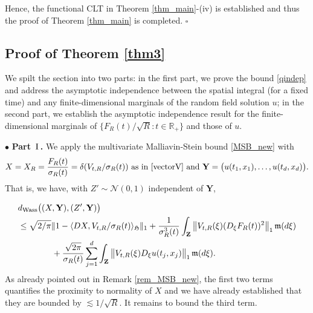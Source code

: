 \documentclass[letterpaper, 11pt,  reqno]{amsart}
\newcommand{\I}{\hspace{0.5mm}\text{I}\hspace{0.5mm}}
\newcommand{\noi}{\noindent}
\newcommand{\R}{\mathbb{R}}
\newcommand{\bul}{\bullet}
\newcommand{\cN}{\mathcal{N}}
\newcommand{\dl}{\delta}
\newcommand{\s}{\sigma}
\newcommand{\les}{\lesssim}
\newcommand{\fm}{\mathfrak{m}}
\newcommand{\fH}{\mathfrak{H}}
\numberwithin{equation}{section}
\numberwithin{theorem}{section}
\begin{document}
 \smallskip
 
 Hence, the functional CLT in Theorem \ref{thm_main}-(iv) is established
 and thus the proof of Theorem \ref{thm_main} is completed.
 \hfill $\square$
 


 
\subsection{Proof of Theorem \ref{thm3}} \label{SEC5_3}

We spilt the section into two parts: in the first part, we prove the bound
\eqref{qindep} and address the asymptotic independence between the spatial
integral (for a fixed time) and any finite-dimensional marginals of the random field 
solution $u$; in the second part, we establish the   asymptotic independence 
result for the finite-dimensional marginals of $\{ F_R(t)/\sqrt{R}: t\in\R_+\}$ and those of $u$.




\smallskip
\noi
$\bul$ {\bf Part $\I$.}
We apply the multivariate Malliavin-Stein bound \eqref{MSB_new}
with 
\begin{align}\label{bfY}
\text{$X= X_R=\frac{F_R(t)}{\s_{R}(t)} = \dl(V_{t, R}/\s_R(t))$ as in \eqref{vectorV} 
and
$\mathbf{Y}=\big(u(t_1,x_1),\ldots,u(t_d,x_d)\big).$}
\end{align}
That is, we have, 
with $Z'\sim\cN(0,1)$ independent of  $\mathbf{Y}$,

\noi
\begin{align*}
& d_{\rm Wass}\big(  (X, \mathbf{Y}),  ( Z', \mathbf{Y})     \big) \\
& \leq 
 \sqrt{2/\pi}  
 \| 1 -\langle DX, V_{t, R}/\s_R(t) \rangle_{\fH} \|_1   
 +  \frac{1}{\s^3_R(t)} \int_{\mathbf{Z}}  \big\| V_{t, R}(\xi)   ( D_\xi F_R(t) )^2  \big\|_1 \, \fm(d\xi)
\\
&\qquad\qquad + 
 \frac{ \sqrt{2\pi} }{\s_R(t)} \sum_{j=1}^d   \int_{\mathbf{Z}}  \big\| V_{t,R}(\xi)    D_\xi  u(t_j, x_j)   \big\|_1 \, \fm(d\xi) .
\end{align*}
As already pointed out in Remark \ref{rem_MSB_new},
the first two terms quantifies the proximity to normality of $X$
and we have already established that they are bounded by $\les 1/\sqrt{R}$.
It remains to bound the third term.
\end{document}
